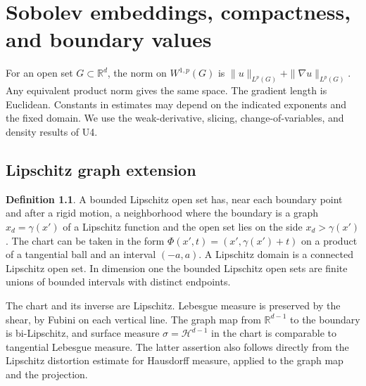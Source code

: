 \documentclass[11pt,oneside,openany]{book}
\theoremstyle{definition}
\newtheorem{definition}[theorem]{Definition}
\theoremstyle{remark}
\begin{document}
\chapter[Sobolev embeddings and traces]{Sobolev embeddings, compactness, and boundary values}
\label{p102:unit-u5}
For an open set \(G\subset\mathbb R^d\), the norm on \(W^{1,p}(G)\) is
\(\|u\|_{L^p(G)}+\|\nabla u\|_{L^p(G)}\). Any equivalent product norm gives
the same space. The gradient length is Euclidean. Constants in estimates
may depend on the indicated exponents and the fixed domain. We use the
weak-derivative, slicing, change-of-variables, and density results of U4.

\section{Lipschitz graph extension}

\begin{definition}
A bounded Lipschitz open set has, near each boundary point and after
a rigid motion, a neighborhood where the boundary is a graph
\(x_d=\gamma(x')\) of a Lipschitz function and the open set lies on
the side \(x_d>\gamma(x')\). The chart can be taken in the form
\(\Phi(x',t)=(x',\gamma(x')+t)\) on a product of a tangential ball
and an interval \((-a,a)\). A Lipschitz domain is a connected
Lipschitz open set. In dimension one the bounded Lipschitz open sets
are finite unions of bounded intervals with distinct endpoints.
\end{definition}
The chart and its inverse are Lipschitz. Lebesgue measure is preserved
by the shear, by Fubini on each vertical line. The graph map from
\(\mathbb R^{d-1}\) to the boundary is bi-Lipschitz, and surface
measure \(\sigma=\mathcal H^{d-1}\) in the chart is comparable to
tangential Lebesgue measure. The latter assertion also follows directly
from the Lipschitz distortion estimate for Hausdorff measure, applied to
the graph map and the projection.
\end{document}
